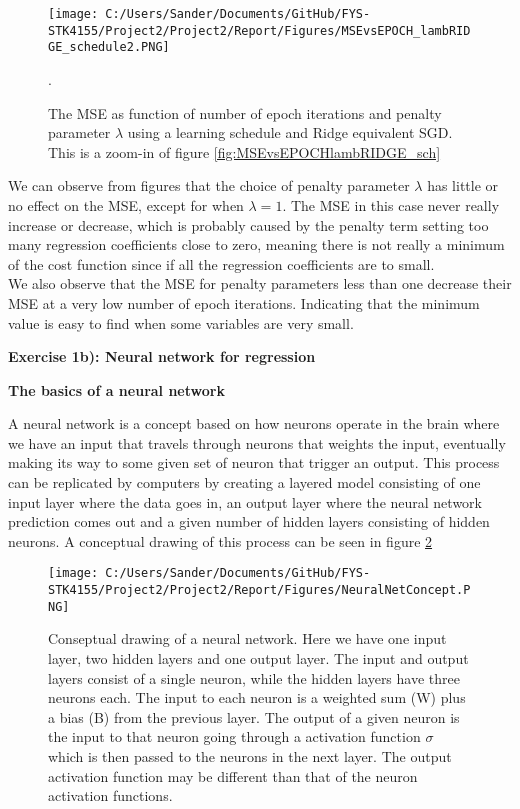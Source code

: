 \documentclass[12pt,a4paper]{article}
\begin{document}
\begin{figure}[H]
\centering
\texttt{[image: C:/Users/Sander/Documents/GitHub/FYS-STK4155/Project2/Project2/Report/Figures/MSEvsEPOCH\_lambRIDGE\_schedule2.PNG]}
\caption{\label{fig:MSEvsEPOCHlambRIDGE_sch2} The MSE as function of number of epoch iterations and penalty parameter $\lambda$ using a learning schedule and Ridge equivalent SGD. This is a zoom-in of figure \ref{fig:MSEvsEPOCHlambRIDGE_sch}}.
\end{figure}

\noindent We can observe from figures that the choice of penalty parameter $\lambda$ has little or no effect on the MSE, except for when $\lambda = 1$. The MSE in this case never really increase or decrease, which is probably caused by the penalty term setting too many regression coefficients close to zero, meaning there is not really a minimum of the cost function since if all the regression coefficients are to small. 
\\
We also observe that the MSE for penalty parameters less than one decrease their MSE at a very low number of epoch iterations. Indicating that the minimum value is easy to find when some variables are very small.

\newpage

\begin{center}
\Large{\textbf{Exercise 1b): Neural network for regression}}
\end{center}

\begin{center}
\large{\textbf{The basics of a neural network}}
\end{center}

\noindent A neural network is a concept based on how neurons operate in the brain where we have an input that travels through neurons that weights the input, eventually making its way to some given set of neuron that trigger an output. This process can be replicated by computers by creating a layered model consisting of one input layer where the data goes in, an output layer where the neural network prediction comes out and a given number of hidden layers consisting of hidden neurons. A conceptual drawing of this process can be seen in figure \ref{fig:nnconcept}

\begin{figure}[H]
\centering
\texttt{[image: C:/Users/Sander/Documents/GitHub/FYS-STK4155/Project2/Project2/Report/Figures/NeuralNetConcept.PNG]}
\caption{\label{fig:nnconcept} Conseptual drawing of a neural network. Here we have one input layer, two hidden layers and one output layer. The input and output layers consist of a single neuron, while the hidden layers have three neurons each. The input to each neuron is a weighted sum (W) plus a bias (B) from the previous layer. The output of a given neuron is the input to that neuron going through a activation function $\sigma$ which is then passed to the neurons in the next layer. The output activation function may be different than that of the neuron activation functions.}
\end{figure}
\end{document}
